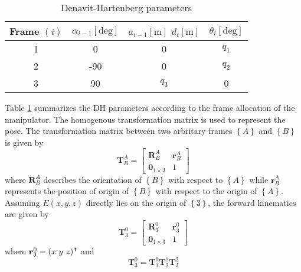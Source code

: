 \begin{table}[h!]
	\centering
	\begin{tabular}{|c|c|c|c|}
		\hline
		\textbf{Frame $\left(i\right)$} &  $\alpha_{i-1} \left[\text{deg}\right]$ & $a_{i-1} \left[\text{m}\right]$ $d_i \left[\text{m}\right]$ & $\theta_i \left[\text{deg}\right]$ \\ \hline
		1                                  & 0                         & 0                 &       $q_1$                              \\ \hline
		2                                 & -90                         & 0                 &       $q_2$                              \\ \hline
		3                                 & 90                         & $q_3$                    & 0                                   \\ \hline
	\end{tabular}
	\caption{Denavit-Hartenberg parameters}
	\label{tab:dh}
\end{table}
Table \ref{tab:dh} summarizes the DH parameters according to the frame allocation of the manipulator. The homogenous transformation matrix is used to represent the pose. The transformation matrix between two arbritary frames $\left\{A\right\}$ and $\left\{B\right\}$ is given by
\begin{equation*}
	\bm{T}_{B}^{A} = \left[\begin{array}{c|c}
		\bm{R}_{B}^{A} & \bm{r}_{B}^{A}\\
		\hline
		\bm{0}_{1\times3} & 1
	\end{array}\right]
\end{equation*}
where $\bm{R}_{B}^{A}$ describes the orientation of $\left\{B\right\}$ with respect to $\left\{A\right\}$ while $\bm{r}_{B}^{A}$ represents the position of origin of $\left\{B\right\}$ with respect to the origin of $\left\{A\right\}$. Assuming $E\left(x,y,z\right)$ directly lies on the origin of $\left\{3\right\}$, the forward kinematics are given by
\begin{equation*}
	\bm{T}_{3}^{0} = \left[\begin{array}{c|c}
		\bm{R}_{3}^{0} & \bm{r}_{3}^{0}\\
		\hline
		\bm{0}_{1\times3} & 1
	\end{array}\right]
\end{equation*}
where $\bm{r}_{3}^{0} = \left(x \text{ } y \text{ } z\right)^\intercal$ and 
\begin{equation*}
	\bm{T}_{3}^{0} = \bm{T}_{1}^{0}\bm{T}_{2}^{1}\bm{T}_{3}^{2}
\end{equation*}

